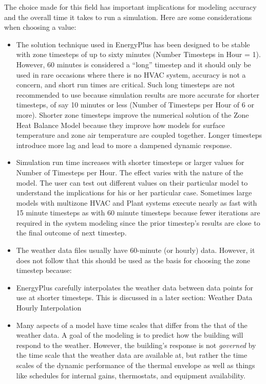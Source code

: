 The choice made for this field has important implications for modeling accuracy and the overall time it takes to run a simulation. Here are some considerations when choosing a value:

\begin{itemize}
    \item
    The solution technique used in EnergyPlus has been designed to be stable with zone timesteps of up to sixty minutes (Number Timesteps in Hour = 1). However, 60 minutes is considered a ``long'' timestep and it should only be used in rare occasions where there is no HVAC system, accuracy is not a concern, and short run times are critical. Such long timesteps are not recommended to use because simulation results are more accurate for shorter timesteps, of say 10 minutes or less (Number of Timesteps per Hour of 6 or more). Shorter zone timesteps improve the numerical solution of the Zone Heat Balance Model because they improve how models for surface temperature and zone air temperature are coupled together. Longer timesteps introduce more lag and lead to more a dampened dynamic response.
    \item
    Simulation run time increases with shorter timesteps or larger values for Number of Timesteps per Hour. The effect varies with the nature of the model. The user can test out different values on their particular model to understand the implications for his or her particular case. Sometimes large models with multizone HVAC and Plant systems execute nearly as fast with 15 minute timesteps as with 60 minute timesteps because fewer iterations are required in the system modeling since the prior timestep's results are close to the final outcome of next timestep.
    \item
    The weather data files usually have 60-minute (or hourly) data. However, it does not follow that this should be used as the basis for choosing the zone timestep because:
    \item
    EnergyPlus carefully interpolates the weather data between data points for use at shorter timesteps. This is discussed in a later section: Weather Data Hourly Interpolation
    \item
    Many aspects of a model have time scales that differ from the that of the weather data. A goal of the modeling is to predict how the building will respond to the weather. However, the building's response is not \emph{governed} by the time scale that the weather data are available at, but rather the time scales of the dynamic performance of the thermal envelope as well as things like schedules for internal gains, thermostats, and equipment availability.

\end{itemize}
